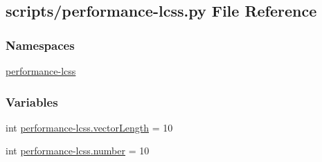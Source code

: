 \hypertarget{performance-lcss_8py}{\subsection{scripts/performance-\/lcss.py File Reference}
\label{performance-lcss_8py}
}
\subsubsection*{Namespaces}
\begin{DoxyCompactItemize}
\item 
\hyperlink{namespaceperformance-lcss}{performance-\/lcss}
\end{DoxyCompactItemize}
\subsubsection*{Variables}
\begin{DoxyCompactItemize}
\item 
int \hyperlink{namespaceperformance-lcss_a3651923e00b4e4ba6cad877ea6d727b2}{performance-\/lcss.\-vector\-Length} = 10
\item 
int \hyperlink{namespaceperformance-lcss_a569a16e2e051498c431c92a3fcad1a26}{performance-\/lcss.\-number} = 10
\end{DoxyCompactItemize}
